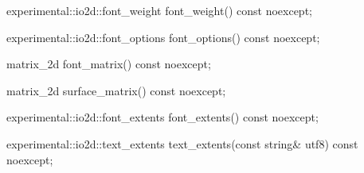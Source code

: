 \begin{itemdecl}
experimental::io2d::font_weight font_weight() const noexcept;
\end{itemdecl}
\begin{itemdescr}
\pnum
\returns

\end{itemdescr}

\begin{itemdecl}
experimental::io2d::font_options font_options() const noexcept;
\end{itemdecl}
\begin{itemdescr}
\pnum
\returns

\end{itemdescr}

\begin{itemdecl}
matrix_2d font_matrix() const noexcept;
\end{itemdecl}
\begin{itemdescr}
\pnum
\returns

\end{itemdescr}

\begin{itemdecl}
matrix_2d surface_matrix() const noexcept;
\end{itemdecl}
\begin{itemdescr}
\pnum
\returns

\end{itemdescr}

\begin{itemdecl}
experimental::io2d::font_extents font_extents() const noexcept;
\end{itemdecl}
\begin{itemdescr}
\pnum
\returns

\end{itemdescr}

\begin{itemdecl}
experimental::io2d::text_extents text_extents(const string& utf8) const 
  noexcept;
\end{itemdecl}
\begin{itemdescr}
\pnum
\returns

\end{itemdescr}

